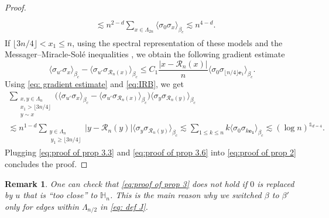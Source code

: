 \documentclass[10pt,a4paper]{amsart}
\numberwithin{equation}{section}
\newtheorem{Rem}[Thm]{Remark}
\begin{document}
\begin{proof}
\begin{align}
\begin{aligned}
    \\
    &\lesssim 
    n^{2-d}\sum_{x\in \Lambda_{2n}}\langle \sigma_0\sigma_x\rangle_{\beta_c}\lesssim n^{4-d}.
      \end{aligned}
 \end{align}
If $\lfloor 3n/4\rfloor <x_1\leq n$, using the spectral representation of these models and the Messager--Miracle-Sol\'e inequalities \cite{MessagerMiracleSoleInequalityIsing}, we obtain the following gradient estimate
\begin{equation}\label{eq: gradient estimate}
    \langle \sigma_{u'}\sigma_x\rangle_{\beta_c}-\langle \sigma_{u'}\sigma_{\mathcal{R}_n(x)}\rangle_{\beta_c}
    \leq 
    C_1\frac{|x-\mathcal{R}_n(x)|}{n}\langle \sigma_0\sigma_{\lfloor n/4\rfloor \mathbf{e}_1}\rangle_{\beta_c}.
\end{equation}
Using \eqref{eq: gradient estimate} and \eqref{eq:IRB}, we get
\begin{multline}\label{eq:proof of prop 3.6}
    \sum_{\substack{x,y\in \Lambda_n\\ x_1> \lfloor 3n/4\rfloor \\y\sim x}}\Big(\langle \sigma_{u'}\sigma_x\rangle_{\beta_c}-\langle \sigma_{u'}\sigma_{\mathcal{R}_n(x)}\rangle_{\beta_c}\Big)\langle \sigma_y\sigma_{\mathcal{R}_n(y)}\rangle_{\beta_c}
    \\\lesssim n^{1-d}\sum_{\substack{y\in \Lambda_n\\ \:y_1\geq \lfloor 3n/4\rfloor }}|y-\mathcal R_n(y)|\langle \sigma_y\sigma_{\mathcal R_n(y)}\rangle_{\beta_c}
    \lesssim \sum_{1\leq k\leq n}k\langle \sigma_0\sigma_{k\mathbf{e_1}}\rangle_{\beta_c}\lesssim (\log n)^{\mathds{1}_{d=4}}.
    \end{multline}
Plugging \eqref{eq:proof of prop 3.3} and \eqref{eq:proof of prop 3.6} into \eqref{eq:proof of prop 2} concludes the proof.
		\end{proof}
\begin{Rem} One can check that \eqref{eq:proof of prop 3} does not hold if $0$ is replaced by $u$ that is ``too close'' to $\mathbb H_n$. This is the main reason why we switched $\beta$ to $\beta'$ only for edges within $\Lambda_{n/2}$ in \eqref{eq: def J}.
\end{Rem}
\end{document}
